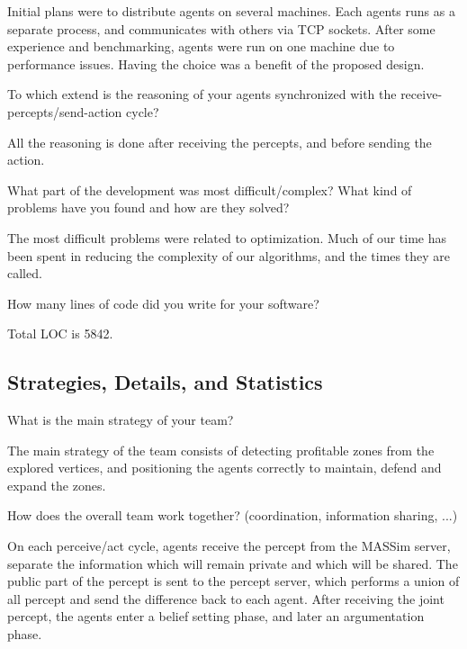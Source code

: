 Initial plans were to distribute agents on several
machines. Each agents runs as a separate process, and communicates with others
via TCP sockets. After some experience and benchmarking, agents were run on one
machine due to performance issues. Having the choice was a benefit of the
proposed design.

\begin{question}
To which extend is the reasoning of your agents synchronized with the
receive-percepts/send-action cycle?
\end{question}

All the reasoning is done after receiving the percepts, and before sending the
action.


\begin{question}
What part of the development was most difficult/complex? What kind of
problems have you found and how are they solved?  
\end{question}

The most difficult problems
were related to optimization. Much of our time has been spent in reducing the
complexity of our algorithms, and the times they are called.

\begin{question}
How many lines of code did you write for your software?  
\end{question}

Total LOC is 5842.

\subsection{Strategies, Details, and Statistics}
\setcounter{question}{0}
\begin{question}
What is the main strategy of your team?
\end{question}

The main strategy of the team consists of detecting profitable zones
from the explored vertices, and positioning the agents correctly to maintain,
defend and expand the zones.

\begin{question}
How does the overall team work together? (coordination, information
sharing, ...) 
\end{question}

On each perceive/act cycle, agents receive the percept from the
MASSim server, separate the information which will remain private and which
will be shared.  The public part of the percept is sent to the percept server,
which performs a union of all percept and send the difference back to each
agent. After receiving the joint percept, the agents enter a belief setting
phase, and later an argumentation phase.

